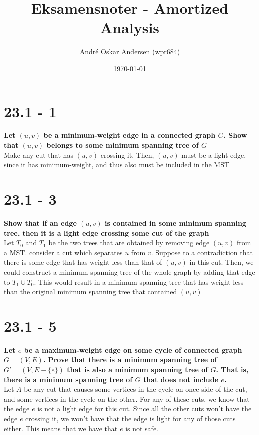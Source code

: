 \documentclass{report}
\title{Eksamensnoter - Amortized Analysis}
\author{André Oskar Andersen (wpr684)}
\date{\today}
\begin{document}
\maketitle

\section*{23.1 - 1}
\textbf{Let $(u, v)$ be a minimum-weight edge in a connected graph $G$. Show that $(u, v)$ belongs to some minimum spanning tree of $G$} \\
Make any cut that has $(u, v)$ crossing it. Then, $(u, v)$ must be a light edge, since it has minimum-weight, and thus also must be included in the MST

\section*{23.1 - 3}
\textbf{Show that if an edge $(u, v)$ is contained in some minimum spanning tree, then it is a light edge crossing some cut of the graph} \\
Let $T_0$ and $T_1$ be the two trees that are obtained by removing edge $(u, v)$ from a MST. consider a cut which separates $u$ from $v$. Suppose to a contradiction that there is some edge that has weight less than that of $(u, v)$ in this cut. Then, we could construct a minimum spanning tree of the whole graph by adding that edge to $T_1 \cup T_0$. This would result in a minimum spanning tree that has weight less than the original minimum spanning tree that contained $(u, v)$

\section*{23.1 - 5}
\textbf{Let $e$ be a maximum-weight edge on some cycle of connected graph $G = (V, E)$. Prove that there is a minimum spanning tree of $G' = (V, E - \{e\})$ that is also a minimum spanning tree of $G$. That is, there is a minimum spanning tree of $G$ that does not include $e$.} \\
Let $A$ be any cut that causes some vertices in the cycle on once side of the cut, and some vertices in the cycle on the other. For any of these cuts, we know that the edge $e$ is not a light edge for this cut. Since all the other cuts won't have the edge $e$ crossing it, we won't have that the edge is light for any of those cuts either. This means that we have that $e$ is not safe.
\end{document}
